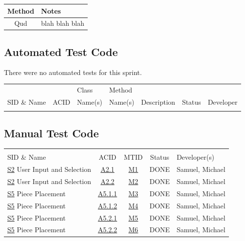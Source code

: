 \documentclass[11pt]{article}
\begin{document}
\begin{center}
\begin{tabular}{|c|l|}
Method & Notes\\
\hline
Qud & blah blah blah\\
\end{tabular}
\end{center}

\subsection{Automated Test Code}
\label{sec:orgdb096fd}

There were no automated tests for this sprint.

\begin{center}
\begin{tabular}{|l|l|p{2.5cm}|p{2.5cm}|p{2.5cm}|l|l|}
 &  & Class & Method &  &  & \\
SID \& Name & ACID & Name(s) & Name(s) & Description & Status & Developer\\
\hline
 &  &  &  &  &  & \\
\end{tabular}
\end{center}
\subsection{Manual Test Code}
\label{sec:orgeb22ea1}
\begin{center}
\begin{tabular}{|p{4.5cm}|c|c|c|p{3.0cm}|}
 &  &  &  & \\
SID \& Name & ACID & MTID & Status & Developer(s)\\
\hline
\hyperref[sec:orgb019917]{S2} User Input and Selection & \hyperref[sec:org5cd9fbb]{A2.1} & \hyperref[sec:orgb3e42e3]{M1} & DONE & Samuel, Michael\\
\hyperref[sec:orgb019917]{S2} User Input and Selection & \hyperref[sec:org5cd9fbb]{A2.2} & \hyperref[sec:orge297348]{M2} & DONE & Samuel, Michael\\
\hyperref[sec:org35a6430]{S5} Piece Placement & \hyperref[sec:orgc4a1e84]{A5.1.1} & \hyperref[sec:org39dc7b5]{M3} & DONE & Samuel, Michael\\
\hyperref[sec:org35a6430]{S5} Piece Placement & \hyperref[sec:orgc4a1e84]{A5.1.2} & \hyperref[sec:orga5162a1]{M4} & DONE & Samuel, Michael\\
\hyperref[sec:org35a6430]{S5} Piece Placement & \hyperref[sec:orgc4a1e84]{A5.2.1} & \hyperref[sec:orgdac00ae]{M5} & DONE & Samuel, Michael\\
\hyperref[sec:org35a6430]{S5} Piece Placement & \hyperref[sec:orgc4a1e84]{A5.2.2} & \hyperref[sec:org3bad8dc]{M6} & DONE & Samuel, Michael\\
\end{tabular}
\end{center}
\end{document}

